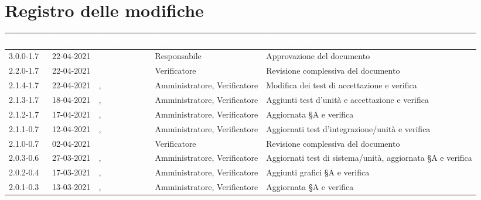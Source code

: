 \section*{Registro delle modifiche}
\setcounter{table}{-1}
{
\setlength\arrayrulewidth{1pt}
\renewcommand{\arraystretch}{1.5}
\centering
\begin{longtable}{C{1.7cm} | C{2.5cm} | C{3.2cm} | C{2.9cm} | C{4.6cm}}
\textcolor{white}{\textbf{Versione}}&
\textcolor{white}{\textbf{Data}}&
\textcolor{white}{\textbf{Nominativo}}&
\textcolor{white}{\textbf{Ruolo}}&
\textcolor{white}{\textbf{Descrizione}}\\	
\endhead

3.0.0-1.7 & 22-04-2021 & \RA{} & Responsabile & Approvazione del documento \\

2.2.0-1.7 & 22-04-2021 & \SG{} & Verificatore & Revisione complessiva del documento \\

2.1.4-1.7 & 22-04-2021	& \SP{}, \BM{} & Amministratore, Verificatore & Modifica dei test di accettazione e verifica\\

2.1.3-1.7 & 18-04-2021 & \SP{}, \BM{} & Amministratore, Verificatore & Aggiunti test d'unità e accettazione e verifica\\

2.1.2-1.7 & 17-04-2021 & \SP{}, \BM{} & Amministratore, Verificatore & Aggiornata \S A e verifica\\

2.1.1-0.7 & 12-04-2021 & \SP{}, \BM{} & Amministratore, Verificatore & Aggiornati test d'integrazione/unità e verifica\\

2.1.0-0.7 & 02-04-2021 & \RA{} & Verificatore & Revisione complessiva del documento \\

2.0.3-0.6 & 27-03-2021 & \PA{}, \ZM{} & Amministratore, Verificatore & Aggiornati test di sistema/unità, aggiornata \S A e verifica\\

2.0.2-0.4 & 17-03-2021 & \SP{}, \SG{} & Amministratore, Verificatore & Aggiunti grafici \S A e verifica\\

2.0.1-0.3 & 13-03-2021 & \SP{}, \SG{} & Amministratore, Verificatore & Aggiornata \S A e verifica\\


\end{longtable}}
